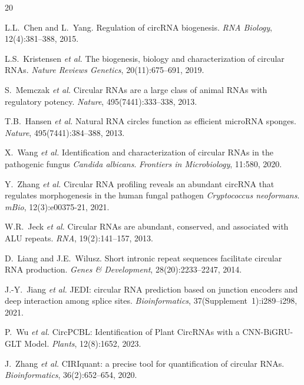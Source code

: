 \documentclass[12pt]{article}
\begin{document}
\begin{thebibliography}{20}

L.L.~Chen and L.~Yang.
\newblock Regulation of circRNA biogenesis.
\newblock \textit{RNA Biology}, 12(4):381--388, 2015.

L.S.~Kristensen \textit{et al.}
\newblock The biogenesis, biology and characterization of circular RNAs.
\newblock \textit{Nature Reviews Genetics}, 20(11):675--691, 2019.

S.~Memczak \textit{et al.}
\newblock Circular RNAs are a large class of animal RNAs with regulatory potency.
\newblock \textit{Nature}, 495(7441):333--338, 2013.

T.B.~Hansen \textit{et al.}
\newblock Natural RNA circles function as efficient microRNA sponges.
\newblock \textit{Nature}, 495(7441):384--388, 2013.

X.~Wang \textit{et al.}
\newblock Identification and characterization of circular RNAs in the pathogenic fungus \textit{Candida albicans}.
\newblock \textit{Frontiers in Microbiology}, 11:580, 2020.

Y.~Zhang \textit{et al.}
\newblock Circular RNA profiling reveals an abundant circRNA that regulates morphogenesis in the human fungal pathogen \textit{Cryptococcus neoformans}.
\newblock \textit{mBio}, 12(3):e00375-21, 2021.

W.R.~Jeck \textit{et al.}
\newblock Circular RNAs are abundant, conserved, and associated with ALU repeats.
\newblock \textit{RNA}, 19(2):141--157, 2013.

D.~Liang and J.E.~Wilusz.
\newblock Short intronic repeat sequences facilitate circular RNA production.
\newblock \textit{Genes \& Development}, 28(20):2233--2247, 2014.

J.-Y.~Jiang \textit{et al.}
\newblock JEDI: circular RNA prediction based on junction encoders and deep interaction among splice sites.
\newblock \textit{Bioinformatics}, 37(Supplement~1):i289--i298, 2021.

P.~Wu \textit{et al.}
\newblock CircPCBL: Identification of Plant CircRNAs with a CNN-BiGRU-GLT Model.
\newblock \textit{Plants}, 12(8):1652, 2023.

J.~Zhang \textit{et al.}
\newblock CIRIquant: a precise tool for quantification of circular RNAs.
\newblock \textit{Bioinformatics}, 36(2):652--654, 2020.

\end{thebibliography}
\end{document}
